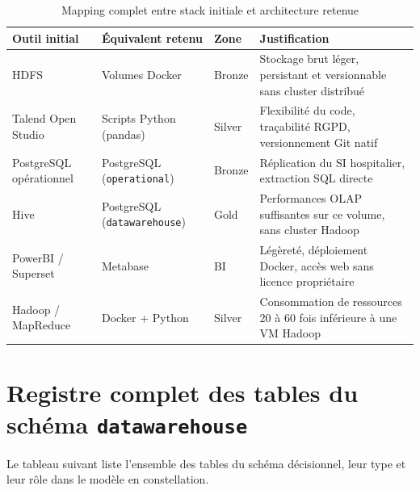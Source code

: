 \documentclass[12pt, a4paper]{report}
\begin{document}
\begin{itemize}[label=\textcolor{chuBlue}{\textbullet}]
\begin{table}[htbp]
\centering\footnotesize\renewcommand{\arraystretch}{1.5}
\begin{tabularx}{\linewidth}{@{} L{3.0cm} L{3.2cm} L{2.5cm} X @{}}
\toprule
{}
\textbf{Outil initial} & \textbf{Équivalent retenu} & \textbf{Zone} & \textbf{Justification} \\
\midrule
HDFS & Volumes Docker & Bronze &
Stockage brut léger, persistant et versionnable sans cluster distribué \\
Talend Open Studio & Scripts Python (pandas) & Silver &
Flexibilité du code, traçabilité RGPD, versionnement Git natif \\
PostgreSQL opérationnel & PostgreSQL (\texttt{operational}) & Bronze &
Réplication du SI hospitalier, extraction SQL directe \\
Hive & PostgreSQL (\texttt{datawarehouse}) & Gold &
Performances OLAP suffisantes sur ce volume, sans cluster Hadoop \\
PowerBI / Superset & Metabase & BI &
Légèreté, déploiement Docker, accès web sans licence propriétaire \\
Hadoop / MapReduce & Docker + Python & Silver &
Consommation de ressources 20 à 60 fois inférieure à une VM Hadoop \\
\bottomrule
\end{tabularx}
\caption{Mapping complet entre stack initiale et architecture retenue}
\label{tab:mapping_annexe}
\end{table}

\clearpage

\chapter{Registre complet des tables du schéma \texttt{datawarehouse}}

Le tableau suivant liste l'ensemble des tables du schéma décisionnel, leur type et leur rôle dans le modèle en constellation.


\end{itemize}
\end{document}
